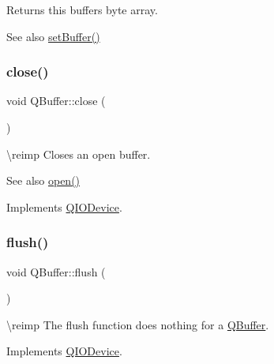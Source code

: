 Returns this buffer\textquotesingle{}s byte array.

\begin{DoxySeeAlso}{See also}
\mbox{\hyperlink{class_q_buffer_ad4c608788c2730ca60295488f75da423}{set\+Buffer()}} 
\end{DoxySeeAlso}
\mbox{\label{class_q_buffer_affd0b382476516b0d4e3adfaf27c0247}} 
\subsubsection{\texorpdfstring{close()}{close()}}
{\footnotesize\ttfamily void Q\+Buffer\+::close (\begin{DoxyParamCaption}{ }\end{DoxyParamCaption})\hspace{0.3cm}{\ttfamily [virtual]}}

\textbackslash{}reimp Closes an open buffer. \begin{DoxySeeAlso}{See also}
\mbox{\hyperlink{class_q_buffer_aa3ceff2217a13a570e0dcec157b23b18}{open()}} 
\end{DoxySeeAlso}


Implements \mbox{\hyperlink{class_q_i_o_device_a01a9ddac5d964b5b6a1f10005bf28a4f}{Q\+I\+O\+Device}}.

\mbox{\label{class_q_buffer_a5e16941f9973d0263ea1ef79b54bc88f}} 
\subsubsection{\texorpdfstring{flush()}{flush()}}
{\footnotesize\ttfamily void Q\+Buffer\+::flush (\begin{DoxyParamCaption}{ }\end{DoxyParamCaption})\hspace{0.3cm}{\ttfamily [virtual]}}

\textbackslash{}reimp The flush function does nothing for a \mbox{\hyperlink{class_q_buffer}{Q\+Buffer}}. 

Implements \mbox{\hyperlink{class_q_i_o_device_a39eccb592ae076fbc42108a3d590fb43}{Q\+I\+O\+Device}}.

\mbox{\label{class_q_buffer_abec634737e1d5a9b314e822737e51992}} 

